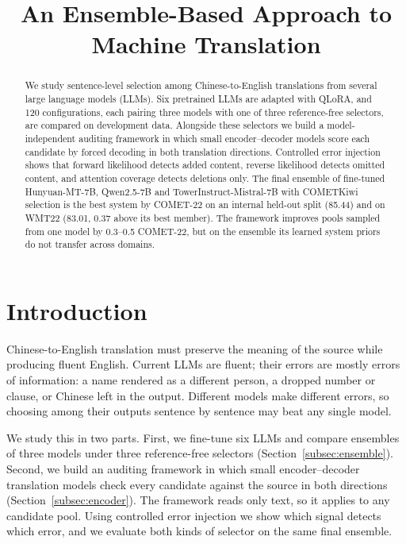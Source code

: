 \documentclass[11pt]{article}
\title{An Ensemble-Based Approach to Machine Translation}
\begin{document}
\maketitle

\begin{abstract}
We study sentence-level selection among Chinese-to-English translations from several large language models (LLMs). Six pretrained LLMs are adapted with QLoRA, and 120 configurations, each pairing three models with one of three reference-free selectors, are compared on development data. Alongside these selectors we build a model-independent auditing framework in which small encoder--decoder models score each candidate by forced decoding in both translation directions. Controlled error injection shows that forward likelihood detects added content, reverse likelihood detects omitted content, and attention coverage detects deletions only. The final ensemble of fine-tuned Hunyuan-MT-7B, Qwen2.5-7B and TowerInstruct-Mistral-7B with COMETKiwi selection is the best system by COMET-22 on an internal held-out split (85.44) and on WMT22 (83.01, 0.37 above its best member). The framework improves pools sampled from one model by 0.3--0.5 COMET-22, but on the ensemble its learned system priors do not transfer across domains.
\end{abstract}

\section{Introduction}
\label{sec:introduction}
Chinese-to-English translation must preserve the meaning of the source while producing fluent English. Current LLMs are fluent; their errors are mostly errors of information: a name rendered as a different person, a dropped number or clause, or Chinese left in the output. Different models make different errors, so choosing among their outputs sentence by sentence may beat any single model.

We study this in two parts. First, we fine-tune six LLMs and compare ensembles of three models under three reference-free selectors (Section~\ref{subsec:ensemble}). Second, we build an auditing framework in which small encoder--decoder translation models check every candidate against the source in both directions (Section~\ref{subsec:encoder}). The framework reads only text, so it applies to any candidate pool. Using controlled error injection we show which signal detects which error, and we evaluate both kinds of selector on the same final ensemble.
\end{document}
